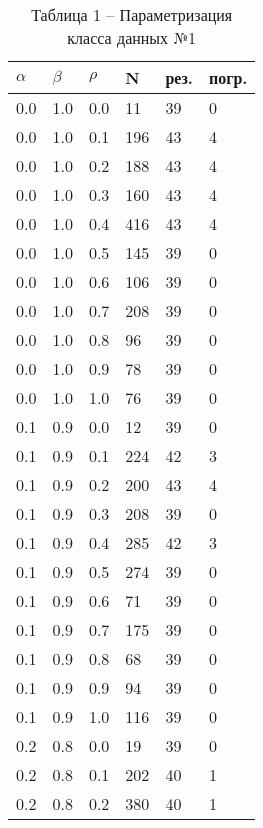 \label{sec:fig1}

\renewcommand\thetable{} 

\begin{table}[!htb]
	\begin{minipage}{.45\linewidth}
		\caption*{Таблица 1 -- Параметризация класса данных №1}
		\centering
		\begin{tabular}{||p{}p{}p{}p{}p{}p{}||}
			\hline
			$\alpha$ & $\beta$ & $\rho$ & N & рез. & погр. \\ \hline\hline
			0.0 & 1.0 & 0.0 & 11 & 39 & 0 \\ 
			0.0 & 1.0 & 0.1 & 196 & 43 & 4 \\ 
			0.0 & 1.0 & 0.2 & 188 & 43 & 4 \\ 
			0.0 & 1.0 & 0.3 & 160 & 43 & 4 \\ 
			0.0 & 1.0 & 0.4 & 416 & 43 & 4 \\ 
			0.0 & 1.0 & 0.5 & 145 & 39 & 0 \\ 
			0.0 & 1.0 & 0.6 & 106 & 39 & 0 \\ 
			0.0 & 1.0 & 0.7 & 208 & 39 & 0 \\ 
			0.0 & 1.0 & 0.8 & 96 & 39 & 0 \\ 
			0.0 & 1.0 & 0.9 & 78 & 39 & 0 \\ 
			0.0 & 1.0 & 1.0 & 76 & 39 & 0  \\ \hline
			0.1 & 0.9 & 0.0 & 12 & 39 & 0 \\ 
			0.1 & 0.9 & 0.1 & 224 & 42 & 3 \\ 
			0.1 & 0.9 & 0.2 & 200 & 43 & 4 \\ 
			0.1 & 0.9 & 0.3 & 208 & 39 & 0 \\ 
			0.1 & 0.9 & 0.4 & 285 & 42 & 3 \\ 
			0.1 & 0.9 & 0.5 & 274 & 39 & 0 \\ 
			0.1 & 0.9 & 0.6 & 71 & 39 & 0 \\ 
			0.1 & 0.9 & 0.7 & 175 & 39 & 0 \\ 
			0.1 & 0.9 & 0.8 & 68 & 39 & 0 \\ 
			0.1 & 0.9 & 0.9 & 94 & 39 & 0 \\ 
			0.1 & 0.9 & 1.0 & 116 & 39 & 0  \\ \hline
			0.2 & 0.8 & 0.0 & 19 & 39 & 0 \\ 
			0.2 & 0.8 & 0.1 & 202 & 40 & 1 \\ 
			0.2 & 0.8 & 0.2 & 380 & 40 & 1 \\ 

\end{tabular}
\end{minipage}
\end{table}
